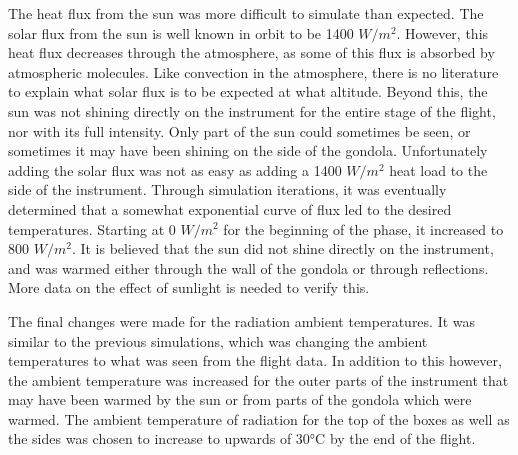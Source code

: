 The heat flux from the sun was more difficult to simulate than expected. The solar flux from the sun is well known in orbit to be 1400 $W/m^2$. However, this heat flux decreases through the atmosphere, as some of this flux is absorbed by atmospheric molecules. Like convection in the atmosphere, there is no literature to explain what solar flux is to be expected at what altitude. Beyond this, the sun was not shining directly on the instrument for the entire stage of the flight, nor with its full intensity. Only part of the sun could sometimes be seen, or sometimes it may have been shining on the side of the gondola. Unfortunately adding the solar flux was not as easy as adding a 1400 $W/m^2$ heat load to the side of the instrument. Through simulation iterations, it was eventually determined that a somewhat exponential curve of flux led to the desired temperatures. Starting at 0 $W/m^2$ for the beginning of the phase, it increased to 800 $W/m^2$. It is believed that the sun did not shine directly on the instrument, and was warmed either through the wall of the gondola or through reflections. More data on the effect of sunlight is needed to verify this.

The final changes were made for the radiation ambient temperatures. It was similar to the previous simulations, which was changing the ambient temperatures to what was seen from the flight data. In addition to this however, the ambient temperature was increased for the outer parts of the instrument that may have been warmed by the sun or from parts of the gondola which were warmed. The ambient temperature of radiation for the top of the boxes as well as the sides was chosen to increase to upwards of 30°C by the end of the flight.

